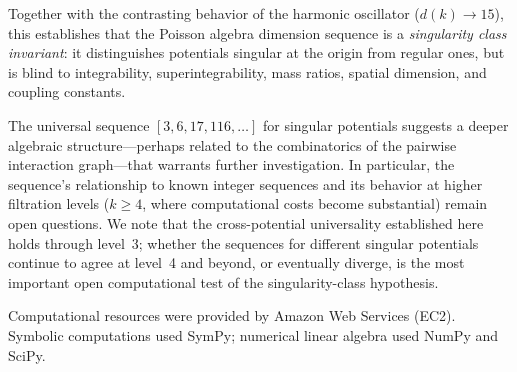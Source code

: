\documentclass[aps,prl,twocolumn,superscriptaddress,showpacs]{revtex4-2}
\begin{document}
Together with the contrasting behavior of the harmonic oscillator
($d(k) \to 15$), this establishes that the Poisson algebra dimension
sequence is a \emph{singularity class invariant}: it distinguishes
potentials singular at the origin from regular ones, but is blind to
integrability, superintegrability, mass ratios, spatial dimension,
and coupling constants.

The universal sequence $[3, 6, 17, 116, \ldots]$ for singular
potentials suggests a deeper algebraic structure---perhaps related to
the combinatorics of the pairwise interaction graph---that warrants
further investigation.  In particular, the sequence's relationship to
known integer sequences and its behavior at higher filtration levels
($k \geq 4$, where computational costs become substantial) remain
open questions.  We note that the cross-potential universality
established here holds through level~3; whether the sequences for
different singular potentials continue to agree at level~4 and beyond,
or eventually diverge, is the most important open computational test
of the singularity-class hypothesis.

\begin{acknowledgments}
Computational resources were provided by Amazon Web Services (EC2).
Symbolic computations used SymPy; numerical linear algebra used
NumPy and SciPy.
\end{acknowledgments}
\end{document}
